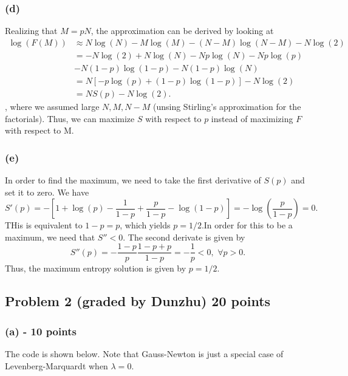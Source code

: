 \documentclass[11pt]{article}
\begin{document}
\subsubsection*{(d)}

Realizing that $M = pN$, the approximation can be derived by looking at 
\begin{subequations}
\begin{align}
\log(F(M)) &\approx N\log(N) - M\log(M) - (N-M)\log(N-M) - N\log(2)\\
&= -N\log(2)+N\log(N)- Np\log(N) - Np\log(p)\\
&- N(1-p)\log(1-p) - N(1-p)\log(N)\\
&= N\left[-p\log(p) + (1-p)\log(1-p)\right]-N\log(2)\\
&=NS(p) -N\log(2).
\end{align}
\end{subequations}, 
where we assumed large $N, M, N-M$ (unsing Stirling's approximation for the factorials). Thus, we can maximize $S$ with respect to $p$ instead of maximizing $F$ with respect to M. 

\subsubsection*{(e)}
In order to find the maximum, we need to take the first derivative of $S(p)$ and set it to zero. We have
\begin{equation}
S'(p) = -[1 + \log(p) - \frac{1}{1-p} + \frac{p}{1-p} - \log(1-p)] = -\log\left( \frac{p}{1-p} \right)=0.
\end{equation}
THis is equivalent to $1-p = p$, which yields $p=1/2$.In order for this to be a maximum, we need that $S''<0$. The second derivate is given by
\begin{equation}
S''(p) = -\frac{1-p}{p}\frac{1-p+p}{1-p}=-\frac{1}{p}<0,\,\, \forall p>0.
\end{equation}
Thus, the maximum entropy solution is given by $p=1/2$.


\subsection*{Problem 2 (graded by Dunzhu) 20 points}
\subsubsection*{(a) - 10 points}
The code is shown below. Note that Gauss-Newton is just a special case of Levenberg-Marquardt when $\lambda=0$. 

\end{document}
